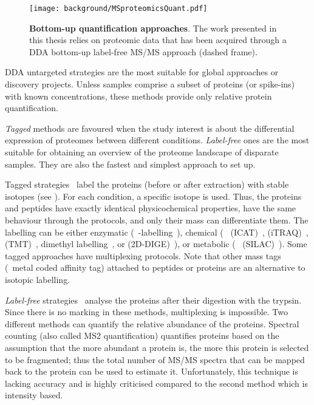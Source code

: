 \begin{figure}[!htbp]
    \texttt{[image: background/MSproteomicsQuant.pdf]}\centering
    \caption[Bottom-up quantification approaches]{\label{fig:msbottomupQuant}%
    \textbf{Bottom-up quantification approaches}.
    The work presented in this thesis relies on proteomic data
    that has been acquired through a \gls{DDA} bottom-up label-free
    \gls{MS/MS} approach (dashed frame).
    }
\end{figure}

\gls{DDA} untargeted strategies are the most suitable
for global approaches or discovery projects.
Unless samples comprise a subset of proteins (or spike-ins)
with known concentrations,
these methods provide only relative protein quantification.\mybr\

\emph{Tagged} methods are favoured
when the study interest is about the differential expression of proteomes between
different conditions.
\emph{Label-free} ones are the most suitable for obtaining an overview of
the proteome landscape of disparate samples.
They are also the fastest and simplest approach to set up.\mybr\

Tagged strategies~ label the proteins
(before or after extraction)
with stable isotopes (see ).
For each condition, a specific isotope is used.
Thus, the proteins and peptides
have exactly identical physicochemical properties,
have the same behaviour through the protocols, and
only their mass can differentiate them.
The labelling can be either
enzymatic (\eg\ -labelling~),
chemical (\eg\  (\gls{ICAT})~,
 (\gls{iTRAQ})~,
 (\gls{TMT})~,
dimethyl labelling~,
or  (\gls{2D-DIGE})~),
or metabolic (\eg\  (\gls{SILAC})~).
Some tagged approaches have multiplexing protocols.
Note that other mass tags (\eg\ metal coded affinity tag)
attached to peptides or proteins are an alternative to isotopic labelling.\mybr\

\emph{Label-free} strategies~
analyse the proteins after their digestion with the trypsin.
Since there is no marking in these methods, multiplexing is impossible.
Two different methods can quantify the relative abundance of the proteins.
Spectral counting (also called MS2 quantification)
quantifies proteins based on the assumption that
the more abundant a protein is, the more this protein is selected to be fragmented;
thus the total number of \gls{MS/MS} spectra that can be mapped back to
the protein can be used to estimate it.
Unfortunately, this technique is lacking accuracy and is highly criticised
compared to the second method which is intensity based.

